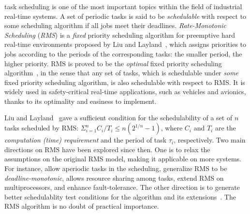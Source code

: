 \documentclass[10pt,journal]{IEEEtran}
\begin{document}
% 
% 
% 
% 
 task scheduling is one of the most important
topics within the field of industrial real-time systems.
A set of periodic tasks is said to be \emph{schedulable} with respect
to some scheduling algorithm if all jobs meet their
deadlines. \emph{Rate-Monotonic Scheduling} (\emph{RMS}) is a
\emph{fixed} priority scheduling algorithm for preemptive hard
real-time environments proposed by Liu and
Layland~\cite{DBLP:journals/jacm/LiuL73}, which assigns priorities to
jobs according to the periods of the corresponding tasks: the smaller
period, the higher priority. RMS is proved to be the \emph{optimal}
fixed priority scheduling algorithm~\cite{DBLP:journals/jacm/LiuL73},
in the sense that any set of tasks, which is schedulable under
\emph{some} fixed priority scheduling algorithm, is also schedulable
with respect to RMS. It is widely used in safety-critical real-time
applications, such as vehicles and avionics, thanks to its optimality
and easiness to implement.

Liu and Layland~\cite{DBLP:journals/jacm/LiuL73} gave a sufficient
condition for the schedulability of a set of $n$ tasks scheduled by
RMS: $\displaystyle\Sigma^n_{i=1}C_i/T_i \le n(2^{1/n}-1)$, where
$C_i$ and $T_i$ are the \emph{computation (time) requirement} and the
period of task $\tau_i$, respectively. Two main directions on RMS have
been explored since then. One is to relax the assumptions on the
original RMS model, making it applicable on more systems.  For
instance,
\cite{DBLP:conf/rtss/LehoczkySS87,DBLP:journals/rts/SpruntSL89,DBLP:conf/rtss/LehoczkyR92,DBLP:journals/tc/StrosniderLS95}
allow aperiodic tasks in the scheduling,
\cite{DBLP:journals/pe/LeungW82,audsley1993deadline} generalize RMS to
be \emph{deadline-monotonic}, \cite{DBLP:journals/tc/ShaRL90} allows
resource sharing among tasks,
\cite{dhall1978real,DBLP:journals/rts/LopezGDG03,DBLP:journals/tpds/LopezDG04,DBLP:journals/tc/BaruahG03}
extend RMS on multiprocessors, and
\cite{DBLP:journals/rts/OhS94,DBLP:journals/rts/GhoshMMS98,DBLP:journals/tpds/BertossiMR99}
enhance fault-tolerance. The other direction is to generate better
schedulablity test conditions for the algorithm and its
extensions~\cite{DBLP:conf/rtss/LehoczkySD89,DBLP:conf/rtss/KuoM91,DBLP:journals/tc/BiniBB03,DBLP:journals/rts/LopezGDG03,DBLP:journals/tc/BaruahG03,gardner1999}. The
RMS algorithm is no doubt of practical importance.
\end{document}
